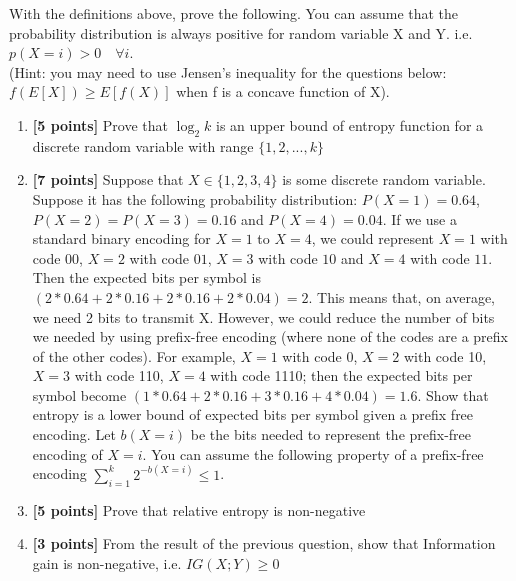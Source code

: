 \documentclass{article}
\newenvironment{soln}{
	\leavevmode\color{blue}\ignorespaces
}{}
\begin{document}
With the definitions above, prove the following. You can assume that the probability distribution is always positive for random variable X and Y. i.e. $p(X=i) > 0 \quad \forall i$. \\(Hint: you may need to use Jensen's inequality for the questions below: $f(E[X]) \ge E[f(X)]$ when f is a concave function of X).
\begin{enumerate}

 
\item \textbf{[5 points]} Prove that $\log_2 k$ is an upper bound of entropy function for a discrete random variable with range $\{1,2,...,k\}$ \\

\begin{soln}

\end{soln}

\item \textbf{[7 points]} Suppose that $X \in \{1,2,3,4\}$ is some discrete random variable. Suppose it has the following probability distribution: $P(X=1)=0.64$, $P(X=2)=P(X=3)=0.16$ and $P(X=4)=0.04$. If we use a standard binary encoding for $X=1$ to $X=4$, we could represent $X=1$ with code $00$, $X=2$ with code $01$, $X=3$ with code $10$ and $X=4$ with code $11$. Then the expected bits per symbol is $(2*0.64+2*0.16+2*0.16+2*0.04)=2$. This means that, on average, we need 2 bits to transmit X. However, we could reduce the number of bits we needed by using prefix-free encoding (where none of the codes are a prefix of the other codes). For example, $X=1$ with code 0, $X=2$ with code 10, $X=3$ with code 110, $X=4$ with code 1110; then the expected bits per symbol become $(1*0.64+2*0.16+3*0.16+4*0.04)=1.6$. Show that entropy is a lower bound of expected bits per symbol given a prefix free encoding. Let $b(X=i)$ be the bits needed to represent the prefix-free encoding of $X=i$. You can assume the following property of a prefix-free encoding $\sum_{i=1}^k 2^{-b(X=i)} \le 1$. \\

\begin{soln}

\end{soln}

\item \textbf{[5 points]} Prove that relative entropy is non-negative \\

\begin{soln}

\end{soln}

\item \textbf{[3 points]} From the result of the previous question, show that Information gain is non-negative, i.e. $IG(X;Y) \ge 0$  \\

\begin{soln}

\end{soln}

\end{enumerate}
\end{document}
